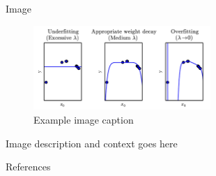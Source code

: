 \documentclass{beamer}
\begin{document}
\begin{frame}{Image}
    \begin{figure}[h]
        \centering
        \includegraphics[width=0.6\textwidth]{./resources/images/gbc16_polynomial_regression.png}
        \caption{Example image caption~\cite{GoodfellowDeepLearning}}
        \label{fig:example}
    \end{figure}

    \begin{example}
        Image description and context goes here
    \end{example}
\end{frame}

\begin{frame}{References}
    \sloppy
    \printbibliography
\end{frame}
\end{document}
